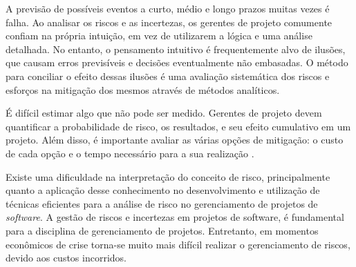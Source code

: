 A previsão de possíveis eventos a curto, médio e longo prazos muitas vezes é falha. Ao analisar os riscos e as incertezas, os gerentes de projeto comumente confiam na própria intuição, em vez de utilizarem a lógica e uma análise detalhada. No entanto, o pensamento intuitivo é frequentemente alvo de ilusões, que causam erros previsíveis e decisões eventualmente não embasadas. O método para conciliar o efeito dessas ilusões é uma avaliação sistemática dos riscos e esforços na mitigação dos mesmos através de métodos analíticos.

É difícil estimar algo que não pode ser medido. Gerentes de projeto devem quantificar a probabilidade de risco, os resultados, e seu efeito cumulativo em um projeto. Além disso, é importante avaliar as várias opções de mitigação: o custo de cada opção e o tempo necessário para a sua realização \cite{VIRINE2009}.

Existe uma dificuldade na interpretação do conceito de risco, principalmente quanto a aplicação desse conhecimento no desenvolvimento e utilização de técnicas eficientes para a análise de risco no gerenciamento de projetos de \textit{software}. A gestão de riscos e incertezas em projetos de software, é fundamental para a disciplina de gerenciamento de projetos. Entretanto, em momentos econômicos de crise torna-se muito mais difícil realizar o gerenciamento de riscos, devido aos custos incorridos.

